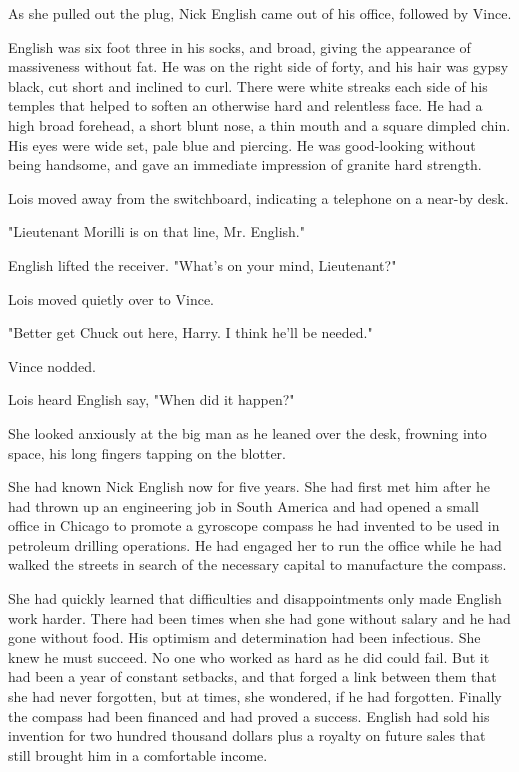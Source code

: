 \documentclass{novel}
\begin{document}
As she pulled out the plug, Nick English came out of his office, followed by Vince.

English was six foot three in his socks, and broad, giving the appearance of massiveness without fat. He was on the right side of forty, and his hair was gypsy black, cut short and inclined to curl. There were white streaks each side of his temples that helped to soften an otherwise hard and relentless face. He had a high broad forehead, a short blunt nose, a thin mouth and a square dimpled chin. His eyes were wide set, pale blue and piercing. He was good-looking without being handsome, and gave an immediate impression of granite hard strength.

Lois moved away from the switchboard, indicating a telephone on a near-by desk.

"Lieutenant Morilli is on that line, Mr. English."

English lifted the receiver. "What's on your mind, Lieutenant?"

Lois moved quietly over to Vince.

"Better get Chuck out here, Harry. I think he'll be needed."

Vince nodded.

Lois heard English say, "When did it happen?"

She looked anxiously at the big man as he leaned over the desk, frowning into space, his long fingers tapping on the blotter.

She had known Nick English now for five years. She had first met him after he had thrown up an engineering job in South America and had opened a small office in Chicago to promote a gyroscope compass he had invented to be used in petroleum drilling operations. He had engaged her to run the office while he had walked the streets in search of the necessary capital to manufacture the compass.

She had quickly learned that difficulties and disappointments only made English work harder. There had been times when she had gone without salary and he had gone without food. His optimism and determination had been infectious. She knew he must succeed. No one who worked as hard as he did could fail. But it had been a year of constant setbacks, and that forged a link between them that she had never forgotten, but at times, she wondered, if he had forgotten. Finally the compass had been financed and had proved a success. English had sold his invention for two hundred thousand dollars plus a royalty on future sales that still brought him in a comfortable income.
\end{document}

